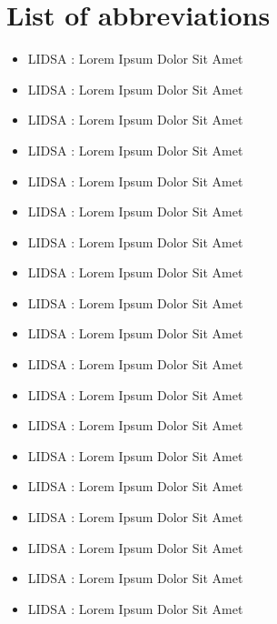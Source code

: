 \chapter*{List of abbreviations}\label{chap:abbréviations}


\begin{itemize}
    \item LIDSA : Lorem Ipsum Dolor Sit Amet
    \item LIDSA : Lorem Ipsum Dolor Sit Amet
    \item LIDSA : Lorem Ipsum Dolor Sit Amet
    \item LIDSA : Lorem Ipsum Dolor Sit Amet
    \item LIDSA : Lorem Ipsum Dolor Sit Amet
    \item LIDSA : Lorem Ipsum Dolor Sit Amet
    \item LIDSA : Lorem Ipsum Dolor Sit Amet
    \item LIDSA : Lorem Ipsum Dolor Sit Amet
    \item LIDSA : Lorem Ipsum Dolor Sit Amet
    \item LIDSA : Lorem Ipsum Dolor Sit Amet
    \item LIDSA : Lorem Ipsum Dolor Sit Amet
    \item LIDSA : Lorem Ipsum Dolor Sit Amet
    \item LIDSA : Lorem Ipsum Dolor Sit Amet
    \item LIDSA : Lorem Ipsum Dolor Sit Amet
    \item LIDSA : Lorem Ipsum Dolor Sit Amet
    \item LIDSA : Lorem Ipsum Dolor Sit Amet
    \item LIDSA : Lorem Ipsum Dolor Sit Amet
    \item LIDSA : Lorem Ipsum Dolor Sit Amet
    \item LIDSA : Lorem Ipsum Dolor Sit Amet
\end{itemize}